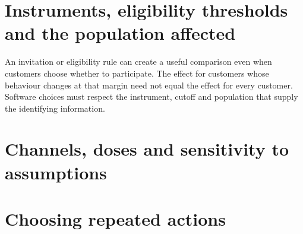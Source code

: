 \documentclass[11pt,a4paper,openany]{book}
\begin{document}
\chapter{Instruments, eligibility thresholds and the population affected}
An invitation or eligibility rule can create a useful comparison even
when customers choose whether to participate. The effect for customers whose
behaviour changes at that margin need not equal the effect for every customer.
Software choices must respect the instrument, cutoff and population that
supply the identifying information.









\chapter{Channels, doses and sensitivity to assumptions}























\chapter{Choosing repeated actions}
\end{document}
